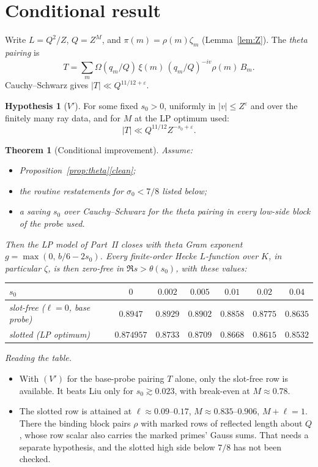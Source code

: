 \documentclass[11pt]{article}
\newtheorem{theorem}{Theorem}
\theoremstyle{definition}
\newtheorem{hypothesis}{Hypothesis}
\theoremstyle{remark}
\newcommand{\eps}{\varepsilon}
\begin{document}
\section{Conditional result}

Write $L=Q^2/Z$, $Q=Z^M$, and $\pi(m)=\rho(m)\zeta_m$ (Lemma~\ref{lem:Z}). The \emph{theta pairing} is
\[
T=\sum_m\Omega(q_m/Q)\,\xi(m)\,(q_m/Q)^{-iv}\rho(m)\,B_m .
\]
Cauchy--Schwarz gives $|T|\ll Q^{11/12+\eps}$.

\begin{hypothesis}[$V'$]
For some fixed $s_0>0$, uniformly in $|v|\le Z^\eps$ and over the finitely many ray data, and for $M$ at the LP optimum used:
\[
|T|\ll Q^{11/12}Z^{-s_0+\eps}.
\]
\end{hypothesis}

\begin{theorem}[Conditional improvement]\label{thm:cond}
Assume:
\begin{itemize}[leftmargin=*]
\item Proposition~\ref{prop:theta}\ref{clean};
\item the routine restatements for $\sigma_0<7/8$ listed below;
\item a saving $s_0$ over Cauchy--Schwarz for the theta pairing in every low-side block of the probe used.
\end{itemize}
Then the LP model of Part~II closes with theta Gram exponent $g=\max(0,\,b/6-2s_0)$. Every finite-order Hecke $L$-function over $K$, in particular $\zeta$, is then zero-free in $\Re s>\theta(s_0)$, with these values:
\begin{center}
\begin{tabular}{lcccccc}
\toprule
$s_0$ & $0$ & $0.002$ & $0.005$ & $0.01$ & $0.02$ & $0.04$\\
\midrule
slot-free ($\ell=0$, base probe) & $0.8947$ & $0.8929$ & $0.8902$ & $0.8858$ & $0.8775$ & $0.8635$\\
slotted (LP optimum) & $0.874957$ & $0.8733$ & $0.8709$ & $0.8668$ & $0.8615$ & $0.8532$\\
\bottomrule
\end{tabular}
\end{center}
\end{theorem}

\noindent\emph{Reading the table.}
\begin{itemize}[leftmargin=*]
\item With $(V')$ for the base-probe pairing $T$ alone, only the slot-free row is available. It beats Liu only for $s_0\gtrsim0.023$, with break-even at $M\approx0.78$.
\item The slotted row is attained at $\ell\approx0.09$--$0.17$, $M\approx0.835$--$0.906$, $M+\ell=1$. There the binding block pairs $\rho$ with marked rows of reflected length about $Q$, whose row scalar also carries the marked primes' Gauss sums. That needs a separate hypothesis, and the slotted high side below $7/8$ has not been checked.
\end{itemize}
\end{document}
